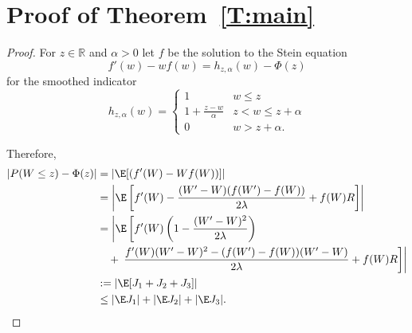\section{Proof of Theorem~\ref{T:main}}
\begin{proof}
  For $z \in \mathbb{R}$ and $\alpha > 0$ let $f$ be the solution to
  the Stein equation
  \begin{equation}
    f'(w) - wf(w) = h_{z,\alpha}(w) - \Phi(z)
  \end{equation}
  for the smoothed indicator
  \begin{equation}
    h_{z,\alpha}(w) =
    \begin{cases}
      1 & w \leq z \\
      1 + \frac{z-w}{\alpha} & z < w \leq z + \alpha \\
      0 & w > z + \alpha.
    \end{cases}
  \end{equation}

  Therefore,
  \begin{equation}
    \label{eq:triple-bound}
    \begin{split}
      |P(W \leq z) - \Phi(z)| &= |\E [(f'(W)-Wf(W))] | \\
      &= \left | \E \left [
          f'(W) - \frac{(W'-W)(f(W')-f(W))}{2\lambda} +f(W)R
        \right ]\right | \\
      &= \left | \E \left [f'(W)\left (1-\frac{(W'-W)^2}{2\lambda}\right) \right . \right . \\
      &\quad + \left . \left .
          \frac{f'(W)(W'-W)^2-(f(W')-f(W))(W'-W)}{2\lambda} + f(W)R
        \right ] \right | \\
      &:= | \E [J_1 + J_2 + J_3] | \\
      &\leq |\E J_1| + |\E J_2| + |\E J_3|.
    \end{split}
  \end{equation}


\end{proof}
